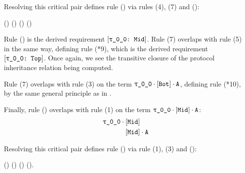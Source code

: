 \documentclass[../generics]{subfiles}
\begin{document}
\begin{example}
\pagebreak

\noindent Resolving this critical pair defines rule () via rules (4), (7) and ():
\begin{center}
\FourLoopDerived%
{\rT\cdot{}\cdot{}}%
{\rT\cdot{}}%
{\rT}%
{\rT\cdot{}}%
{()\cdot{}}%
{()}%
{()}%
{\rT\cdot()}
\end{center}
Rule () is the derived requirement $\ConfReq{\rT}{Mid}$. Rule (7) overlaps with rule (5) in the same way, defining rule (*9), which is the derived requirement $\ConfReq{\rT}{Top}$. Once again, we see the transitive closure of the protocol inheritance relation being computed.

Rule (7) overlaps with rule (3) on the term $\rT\cdot\protosym{Bot}\cdot\nA$, defining rule (*10), by the same general principle as in .

Finally, rule () overlaps with rule (1) on the term $\rT\cdot\protosym{Mid}\cdot\nA$:
\begin{align*}
\rT\cdot{}&\protosym{Mid}\\
&\protosym{Mid}\cdot\nA
\end{align*}

Resolving this critical pair defines rule () via rule (1), (3) and ():
\begin{center}
\FourLoopDerived%
{\rT\cdot{}\cdot\nA}%
{\rT\cdot{}}%
{\rT\cdot{}}%
{\rT\cdot\nA}%
{\rT\cdot()}%
{(\rT\cdot{}\Rightarrow\rT\cdot{})}%
{\rT\cdot()}%
{().\nA}
\end{center}


\end{example}
\end{document}
